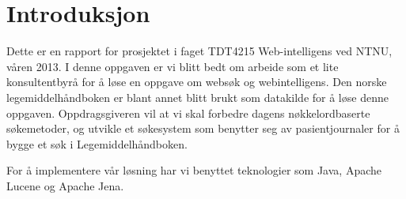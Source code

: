 \section{Introduksjon}
\label{sec:introduction}

Dette er en rapport for prosjektet i faget TDT4215 Web-intelligens ved NTNU, våren 2013. I denne oppgaven er vi blitt bedt om arbeide som et lite konsultentbyrå for å løse en oppgave om websøk og webintelligens. Den norske legemiddelhåndboken er blant annet blitt brukt som datakilde for å løse denne oppgaven. Oppdragsgiveren vil at vi skal forbedre dagens nøkkelordbaserte søkemetoder, og utvikle et søkesystem som benytter seg av pasientjournaler for å bygge et søk i Legemiddelhåndboken.

For å implementere vår løsning har vi benyttet teknologier som Java, Apache Lucene og Apache Jena.